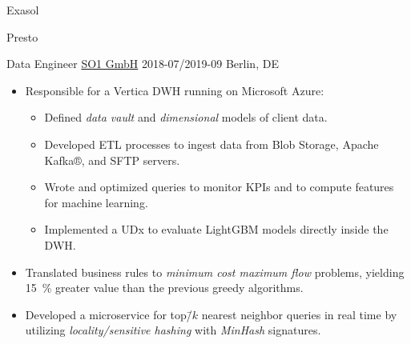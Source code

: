 \documentclass[11pt,letterpaper]{article}%
\begin{document}
\begin{minipage}[t]{0.575\textwidth}
{\begin{adjustbox}{valign=m,minipage=.15\linewidth,margin=0 0 0 16pt}
      \begin{tcolorbox}[remember as=Exasol,width=\linewidth]
        Exasol
      \end{tcolorbox}%
      \newline%
      \begin{tcolorbox}[remember as=Presto,width=\linewidth]
        Presto
      \end{tcolorbox}%
    \end{adjustbox}%
    \medskip
  }

  \WorkEntry%
  {Data Engineer}%
  {\href{https://www.so1.ai/en/}{SO1 GmbH}}%
  {2018-07/2019-09}%
  {Berlin, DE}%
  {%
    \begin{itemize}[nosep,leftmargin=*]
    \item Responsible for a Vertica DWH running on Microsoft Azure:
      \begin{itemize}[nosep]
      \item Defined \emph{data vault} and \emph{dimensional} models of client
        data.
      \item Developed ETL processes to ingest data from Blob Storage, Apache
        Kafka®, and SFTP servers.
      \item Wrote and optimized queries to monitor KPIs and to compute features
        for machine learning.
      \item Implemented a UDx to evaluate LightGBM models directly inside the
        DWH.
      \end{itemize}
    \item Translated business rules to \emph{minimum cost maximum flow}
      problems, yielding \SI{15}{\percent} greater value than the previous
      greedy algorithms.
    \item Developed a microservice for top\=/\(k\) nearest neighbor queries in
      real time by utilizing \emph{locality\-/sensitive hashing} with
      \emph{MinHash} signatures.
    \end{itemize}
  }


\end{minipage}
\end{document}
